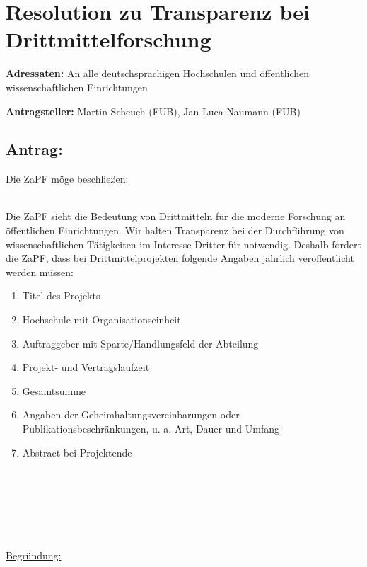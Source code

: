 \documentclass[DIV=9]{scrartcl}
\begin{document}
\section*{Resolution zu Transparenz bei Drittmittelforschung}

\textbf{Adressaten:} An alle deutschsprachigen Hochschulen und öffentlichen wissenschaftlichen Einrichtungen

\textbf{Antragsteller:} Martin Scheuch (FUB), Jan Luca Naumann (FUB)

\subsection*{Antrag:}
Die ZaPF möge beschließen:\\\\

\begin{minipage}{\textwidth}
Die ZaPF sieht die Bedeutung von Drittmitteln für die moderne Forschung an öffentlichen Einrichtungen. Wir halten Transparenz bei der Durchführung von wissenschaftlichen Tätigkeiten im Interesse Dritter für notwendig. Deshalb fordert die ZaPF, dass bei Drittmittelprojekten folgende Angaben jährlich veröffentlicht werden müssen:\\
\begin{enumerate}
\item Titel des Projekts \footnotemark[1]
\item Hochschule mit Organisationseinheit
\item Auftraggeber mit Sparte/Handlungsfeld der Abteilung \footnotemark[2]
\item Projekt- und Vertragslaufzeit 
\item Gesamtsumme
\item Angaben der Geheimhaltungsvereinbarungen oder Publikationsbeschränkungen, u. a. Art, Dauer und Umfang
\item Abstract bei Projektende \footnotemark[1]
\end{enumerate}
~\\
\end{minipage}
~\\\\\\\\
\underline{Begründung:}\\\\
\end{document}
